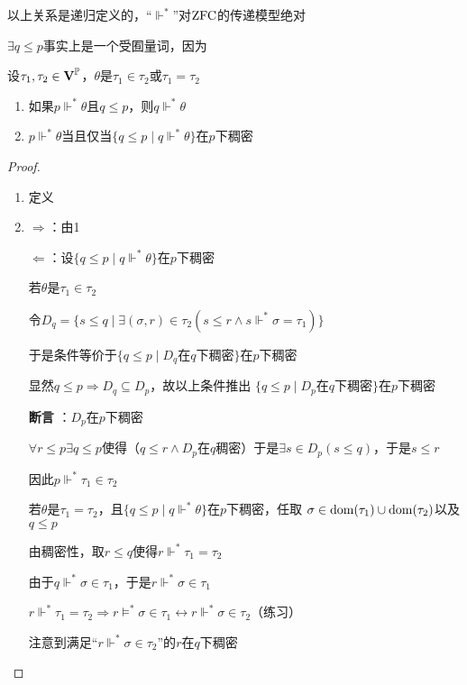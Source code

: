 \documentclass[11pt]{article}
\begin{document}
以上关系是递归定义的，“\(\Vdash^*\)”对\(\operatorname{ZFC}\)的传递模型绝对

\(\exists q\le p\)事实上是一个受囿量词，因为

\begin{lemma}[]
设\(\tau_1,\tau_2\in\operatorname{\textbf{V}}^{\mathbb{P}}\)，\(\theta\)是\(\tau_1\in\tau_2\)或\(\tau_1=\tau_2\)
\begin{enumerate}
\item 如果\(p\Vdash^*\theta\)且\(q\le p\)，则\(q\Vdash^*\theta\)
\item \(p\Vdash^*\theta\)当且仅当\(\{q\le p\mid q\Vdash^*\theta\}\)在\(p\)下稠密
\end{enumerate}
\end{lemma}

\begin{proof}
\begin{enumerate}
\item 定义
\item \(\Rightarrow\)：由1

\(\Leftarrow\)：设\(\{q\le p\mid q\Vdash^*\theta\}\)在\(p\)下稠密

若\(\theta\)是\(\tau_1\in\tau_2\)

令\(D_q=\{s\le q\mid\exists(\sigma,r)\in\tau_2(s\le r\wedge s\Vdash^*\sigma=\tau_1)\}\)

于是条件等价于\(\{q\le p\mid D_q\text{在$q$下稠密}\}\)在\(p\)下稠密

显然\(q\le p\Rightarrow D_q\subseteq D_p\)，故以上条件推出
\(\{q\le p\mid D_p\text{在$q$下稠密}\}\)在\(p\)下稠密

\textbf{断言} ：\(D_p\)在\(p\)下稠密

\(\forall r\le p\exists q\le p\)使得（\(q\le r\wedge D_p\text{在$q$稠密}\)）于是\(\exists s\in D_p(s\le q)\)，于是\(s\le r\)

因此\(p\Vdash^*\tau_1\in\tau_2\)

若\(\theta\)是\(\tau_1=\tau_2\)，且\(\{q\le p\mid q\Vdash^*\theta\}\)在\(p\)下稠密，任取
\(\sigma\in\operatorname{dom}(\tau_1)\cup\operatorname{dom}(\tau_2)\)以及\(q\le p\)

由稠密性，取\(r\le q\)使得\(r\Vdash^*\tau_1=\tau_2\)

由于\(q\Vdash^*\sigma\in\tau_1\)，于是\(r\Vdash^*\sigma\in\tau_1\)

\(r\Vdash^*\tau_1=\tau_2\Rightarrow r\vDash^*\sigma\in\tau_1\leftrightarrow r\Vdash^*\sigma\in\tau_2\)（练习）

注意到满足“\(r\Vdash^*\sigma\in\tau_2\)”的\(r\)在\(q\)下稠密
\end{enumerate}
\end{proof}
\end{document}
